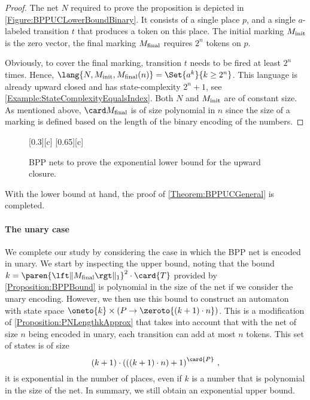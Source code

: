 \documentclass[../../diss.tex]{subfiles}
\begin{document}
\begin{proof}
    The net $N$ required to prove the proposition is depicted in \cref{Figure:BPPUCLowerBoundBinary}.
    It consists of a single place $p$, and a single $a$-labeled transition $t$ that produces a token on this place.
    The initial marking $M_{\text{init}}$ is the zero vector, the final marking $M_{\text{final}}$ requires $2^n$ tokens on $p$.

    Obviously, to cover the final marking, transition $t$ needs to be fired at least $2^n$ times.
    Hence, $\lang{N, \Minit, \Mfinal(n)} = \Set{ a^k }{ k \geq 2^n}$.
    This language is already upward closed and has state-complexity $2^n + 1$, see \cref{Example:StateComplexityEqualsIndex}.
    Both $N$ and $M_{\text{init}}$ are of constant size.
    As mentioned above, $\size{\Mfinal}$ is of size polynomial in $n$ since the size of a marking is defined based on the length of the binary encoding of the numbers.
\end{proof}

\begin{figure}[t]%
    {\centering{}[0.3\textwidth][c]{
        }
    }
    {\centering{}[0.65\textwidth][c]{
        }
    }
    \caption{BPP nets to prove the exponential lower bound for the upward closure.}%
    \label{Figure:BPPUCLowerBound}%
\end{figure}

With the lower bound at hand, the proof of \cref{Theorem:BPPUCGeneral} is completed.

\paragraph{The unary case}

We complete our study by considering the case in which the BPP net is encoded in unary.
We start by inspecting the upper bound, noting that the bound $k = \paren{\normone{\Mfinal}}^2 \cdot \card{T}$ provided by \cref{Proposition:BPPBound} is polynomial in the size of the net if we consider the unary encoding.
However, we then use this bound to construct an automaton with state space $\oneto{k} \times (P \to \zeroto{(k+1) \cdot n})$.
This is a modification of \cref{Proposition:PNLengthkApprox} that takes into account that with the net of size $n$ being encoded in unary, each transition can add at most $n$ tokens.
This set of states is of size
\[
    (k+1) \cdot {(((k+1) \cdot n) + 1)}^{\card{P}}
    \ ,
\]
\ie it is exponential in the number of places, even if $k$ is a number that is polynomial in the size of the net.
In summary, we still obtain an exponential upper bound.
\end{document}
